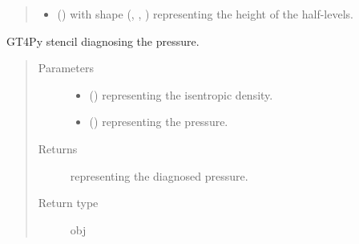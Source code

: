 \documentclass[letterpaper,10pt,english]{sphinxmanual}
\begin{document}
\begin{fulllineitems}
\begin{fulllineitems}
\begin{quote}
\begin{description}
\begin{itemize}
\item {} 
 () \textendash{}  with shape (, , ) representing the height of the half-levels.

\end{itemize}

\end{description}\end{quote}

\end{fulllineitems}


\begin{fulllineitems}
\label{\detokenize{api:dycore.diagnostic_isentropic.DiagnosticIsentropic._stencil_diagnosing_air_pressure_defs}}
GT4Py stencil diagnosing the pressure.
\begin{quote}\begin{description}
\item[{Parameters}] \leavevmode\begin{itemize}
\item {} 
 () \textendash{}  representing the isentropic density.

\item {} 
 () \textendash{}  representing the pressure.

\end{itemize}

\item[{Returns}] \leavevmode
{} representing the diagnosed pressure.

\item[{Return type}] \leavevmode
obj

\end{description}\end{quote}

\end{fulllineitems}


\end{fulllineitems}
\end{document}
